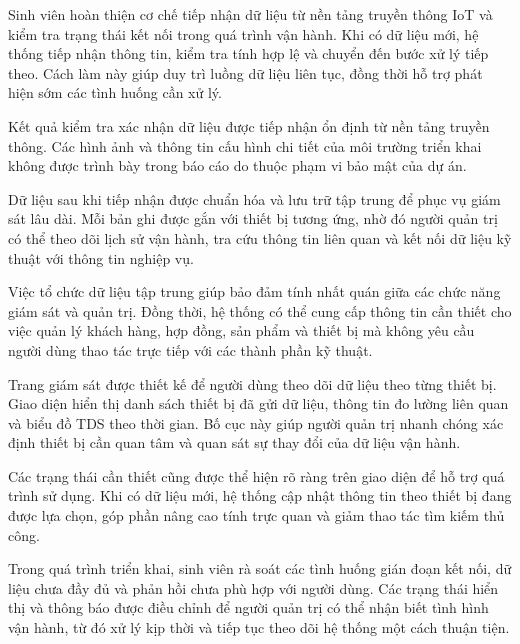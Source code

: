 Sinh viên hoàn thiện cơ chế tiếp nhận dữ liệu từ nền tảng truyền thông IoT và kiểm tra trạng thái kết nối trong quá trình vận hành. Khi có dữ liệu mới, hệ thống tiếp nhận thông tin, kiểm tra tính hợp lệ và chuyển đến bước xử lý tiếp theo. Cách làm này giúp duy trì luồng dữ liệu liên tục, đồng thời hỗ trợ phát hiện sớm các tình huống cần xử lý.

Kết quả kiểm tra xác nhận dữ liệu được tiếp nhận ổn định từ nền tảng truyền thông. Các hình ảnh và thông tin cấu hình chi tiết của môi trường triển khai không được trình bày trong báo cáo do thuộc phạm vi bảo mật của dự án.


Dữ liệu sau khi tiếp nhận được chuẩn hóa và lưu trữ tập trung để phục vụ giám sát lâu dài. Mỗi bản ghi được gắn với thiết bị tương ứng, nhờ đó người quản trị có thể theo dõi lịch sử vận hành, tra cứu thông tin liên quan và kết nối dữ liệu kỹ thuật với thông tin nghiệp vụ.

Việc tổ chức dữ liệu tập trung giúp bảo đảm tính nhất quán giữa các chức năng giám sát và quản trị. Đồng thời, hệ thống có thể cung cấp thông tin cần thiết cho việc quản lý khách hàng, hợp đồng, sản phẩm và thiết bị mà không yêu cầu người dùng thao tác trực tiếp với các thành phần kỹ thuật.


Trang giám sát được thiết kế để người dùng theo dõi dữ liệu theo từng thiết bị. Giao diện hiển thị danh sách thiết bị đã gửi dữ liệu, thông tin đo lường liên quan và biểu đồ TDS theo thời gian. Bố cục này giúp người quản trị nhanh chóng xác định thiết bị cần quan tâm và quan sát sự thay đổi của dữ liệu vận hành.

Các trạng thái cần thiết cũng được thể hiện rõ ràng trên giao diện để hỗ trợ quá trình sử dụng. Khi có dữ liệu mới, hệ thống cập nhật thông tin theo thiết bị đang được lựa chọn, góp phần nâng cao tính trực quan và giảm thao tác tìm kiếm thủ công.


Trong quá trình triển khai, sinh viên rà soát các tình huống gián đoạn kết nối, dữ liệu chưa đầy đủ và phản hồi chưa phù hợp với người dùng. Các trạng thái hiển thị và thông báo được điều chỉnh để người quản trị có thể nhận biết tình hình vận hành, từ đó xử lý kịp thời và tiếp tục theo dõi hệ thống một cách thuận tiện.


